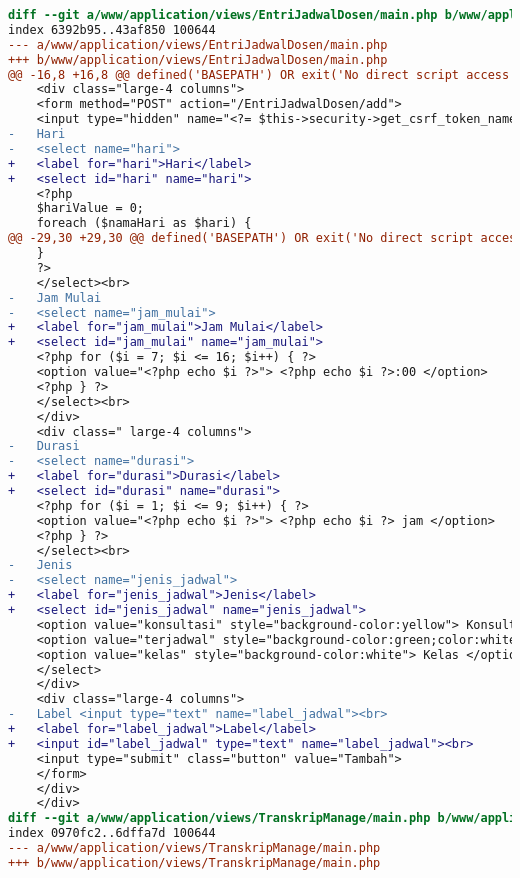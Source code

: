 \begin{lstlisting}[frame=single, label={lst:perbaikan_2.5.3_label_dan_nama_pada_komponen_masukan}, language=diff, caption=Perbaikan Kriteria Sukses 2.5.3 - Label dan Nama Pada Komponen Masukan]
diff --git a/www/application/views/EntriJadwalDosen/main.php b/www/application/views/EntriJadwalDosen/main.php
index 6392b95..43af850 100644
--- a/www/application/views/EntriJadwalDosen/main.php
+++ b/www/application/views/EntriJadwalDosen/main.php
@@ -16,8 +16,8 @@ defined('BASEPATH') OR exit('No direct script access allowed');
    <div class="large-4 columns">
    <form method="POST" action="/EntriJadwalDosen/add">
    <input type="hidden" name="<?= $this->security->get_csrf_token_name() ?>" value="<?= $this->security->get_csrf_hash() ?>" />
-   Hari
-   <select name="hari"> 
+   <label for="hari">Hari</label>
+   <select id="hari" name="hari"> 
    <?php
    $hariValue = 0;
    foreach ($namaHari as $hari) {
@@ -29,30 +29,30 @@ defined('BASEPATH') OR exit('No direct script access allowed');
    }
    ?>
    </select><br>
-   Jam Mulai
-   <select name="jam_mulai"> 
+   <label for="jam_mulai">Jam Mulai</label>
+   <select id="jam_mulai" name="jam_mulai">  
    <?php for ($i = 7; $i <= 16; $i++) { ?>
    <option value="<?php echo $i ?>"> <?php echo $i ?>:00 </option>
    <?php } ?>
    </select><br>
    </div>
    <div class=" large-4 columns">
-   Durasi
-   <select name="durasi"> 
+   <label for="durasi">Durasi</label>
+   <select id="durasi" name="durasi">  
    <?php for ($i = 1; $i <= 9; $i++) { ?>
    <option value="<?php echo $i ?>"> <?php echo $i ?> jam </option>
    <?php } ?>
    </select><br>
-   Jenis  
-   <select name="jenis_jadwal"> 
+   <label for="jenis_jadwal">Jenis</label>
+   <select id="jenis_jadwal" name="jenis_jadwal">  
    <option value="konsultasi" style="background-color:yellow"> Konsultasi </option>
    <option value="terjadwal" style="background-color:green;color:white"> Terjadwal</option>
    <option value="kelas" style="background-color:white"> Kelas </option>
    </select>
    </div>
    <div class="large-4 columns">
-   Label <input type="text" name="label_jadwal"><br>
+   <label for="label_jadwal">Label</label>
+   <input id="label_jadwal" type="text" name="label_jadwal"><br>
    <input type="submit" class="button" value="Tambah">
    </form>
    </div>
    </div>
diff --git a/www/application/views/TranskripManage/main.php b/www/application/views/TranskripManage/main.php
index 0970fc2..6dffa7d 100644
--- a/www/application/views/TranskripManage/main.php
+++ b/www/application/views/TranskripManage/main.php

\end{lstlisting}
